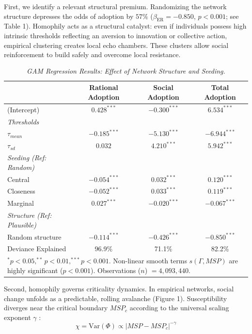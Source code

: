 \documentclass[12pt, a4paper]{article}
\begin{document}
First, we identify a relevant structural premium. Randomizing the network structure depresses the odds of adoption by $57\%$ ($\beta_{\text{ER}} = -0.850$, $p < 0.001$; see Table 1). Homophily acts as a structural catalyst: even if individuals possess high intrinsic thresholds reflecting an aversion to innovation or collective action, empirical clustering creates local echo chambers. These clusters allow social reinforcement to build safely and overcome local resistance. 

\begin{table}[htbp]
\centering
\caption{\textit{GAM Regression Results: Effect of Network Structure and Seeding.}}
\begin{tabular}{lccc}
\toprule
 & Rational Adoption & Social Adoption & Total Adoption \\
\midrule
(Intercept) & $0.428^{***}$ & $-0.300^{***}$ & $6.534^{***}$ \\
\addlinespace
\textit{Thresholds} \\
$\tau_{mean}$ & $-0.185^{***}$ & $-5.130^{***}$ & $-6.944^{***}$ \\
$\tau_{sd}$ & $0.032$ & $4.210^{***}$ & $5.942^{***}$ \\
\addlinespace
\textit{Seeding (Ref: Random)} \\
Central & $-0.054^{***}$ & $0.032^{***}$ & $0.120^{***}$ \\
Closeness & $-0.052^{***}$ & $0.033^{***}$ & $0.119^{***}$ \\
Marginal & $0.027^{***}$ & $-0.020^{***}$ & $-0.067^{***}$ \\
\addlinespace
\textit{Structure (Ref: Plausible)} \\
Random structure & $-0.114^{***}$ & $-0.426^{***}$ & $\mathbf{-0.850}^{***}$ \\
\midrule
Deviance Explained & 96.9\% & 71.1\% & 82.2\% \\
\bottomrule
\multicolumn{4}{p{0.9\textwidth}}{\footnotesize $^{*}p<0.05, ^{**}p<0.01, ^{***}p<0.001$. Non-linear smooth terms $s(\Gamma, MSP)$ are highly significant ($p<0.001$). Observations ($n$) $= 4,093,440$.}
\end{tabular}
\end{table}

Second, homophily governs criticality dynamics. In empirical networks, social change unfolds as a predictable, rolling avalanche (Figure 1). Susceptibility diverges near the critical boundary $MSP_c$ according to the universal scaling exponent $\gamma$ \cite{sethna2021}:
$$ \chi = \text{Var}(\Phi) \propto |MSP - MSP_c|^{-\gamma} $$
\end{document}
